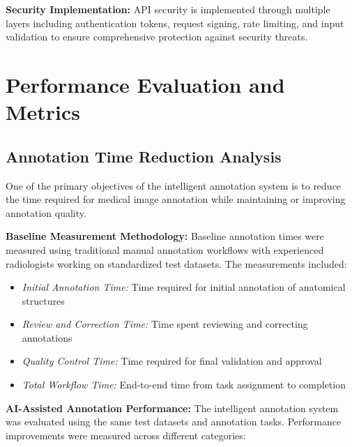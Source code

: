 \textbf{Security Implementation:} API security is implemented through multiple layers including authentication tokens, request signing, rate limiting, and input validation to ensure comprehensive protection against security threats.

\section{Performance Evaluation and Metrics}

\subsection{Annotation Time Reduction Analysis}

One of the primary objectives of the intelligent annotation system is to reduce the time required for medical image annotation while maintaining or improving annotation quality.

\textbf{Baseline Measurement Methodology:} Baseline annotation times were measured using traditional manual annotation workflows with experienced radiologists working on standardized test datasets. The measurements included:

\begin{itemize}
    \item \textit{Initial Annotation Time:} Time required for initial annotation of anatomical structures
    \item \textit{Review and Correction Time:} Time spent reviewing and correcting annotations
    \item \textit{Quality Control Time:} Time required for final validation and approval
    \item \textit{Total Workflow Time:} End-to-end time from task assignment to completion
\end{itemize}

\textbf{AI-Assisted Annotation Performance:} The intelligent annotation system was evaluated using the same test datasets and annotation tasks. Performance improvements were measured across different categories:

